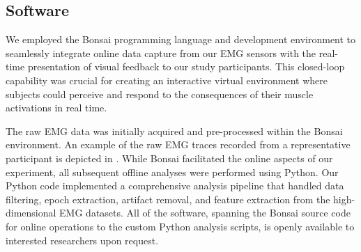 \documentclass[../main.tex]{subfiles}
\begin{document}
\subsection{Software}

We employed the Bonsai programming language and development environment to seamlessly integrate online data capture from our EMG sensors with the real-time presentation of visual feedback to our study participants. This closed-loop capability was crucial for creating an interactive virtual environment where subjects could perceive and respond to the consequences of their muscle activations in real time.

The raw EMG data was initially acquired and pre-processed within the Bonsai environment. An example of the raw EMG traces recorded from a representative participant is depicted in . While Bonsai facilitated the online aspects of our experiment, all subsequent offline analyses were performed using Python. Our Python code implemented a comprehensive analysis pipeline that handled data filtering, epoch extraction, artifact removal, and feature extraction from the high-dimensional EMG datasets. All of the software, spanning the Bonsai source code for online operations to the custom Python analysis scripts, is openly available to interested researchers upon request.
\end{document}

